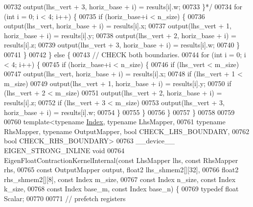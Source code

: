 \begin{DoxyCode}
00732 \textcolor{comment}{      output(lhs\_vert + 3, horiz\_base + i) = results[i].w;}
00733 \textcolor{comment}{    \}*/}
00734     \textcolor{keywordflow}{for} (\textcolor{keywordtype}{int} i = 0; i < 4; i++) \{
00735       \textcolor{keywordflow}{if} (horiz\_base+i < n\_size) \{
00736         output(lhs\_vert, horiz\_base + i) = results[i].x;
00737         output(lhs\_vert + 1, horiz\_base + i) = results[i].y;
00738         output(lhs\_vert + 2, horiz\_base + i) = results[i].z;
00739         output(lhs\_vert + 3, horiz\_base + i) = results[i].w;
00740        \}
00741     \}
00742   \} \textcolor{keywordflow}{else} \{
00743     \textcolor{comment}{// CHECK both boundaries.}
00744     \textcolor{keywordflow}{for} (\textcolor{keywordtype}{int} i = 0; i < 4; i++) \{
00745       \textcolor{keywordflow}{if} (horiz\_base+i < n\_size) \{
00746         \textcolor{keywordflow}{if} (lhs\_vert < m\_size)
00747           output(lhs\_vert, horiz\_base + i) = results[i].x;
00748         \textcolor{keywordflow}{if} (lhs\_vert + 1 < m\_size)
00749           output(lhs\_vert + 1, horiz\_base + i) = results[i].y;
00750         \textcolor{keywordflow}{if} (lhs\_vert + 2 < m\_size)
00751           output(lhs\_vert + 2, horiz\_base + i) = results[i].z;
00752         \textcolor{keywordflow}{if} (lhs\_vert + 3 < m\_size)
00753           output(lhs\_vert + 3, horiz\_base + i) = results[i].w;
00754       \}
00755     \}
00756   \}
00757 \}
00758 
00759 
00760 \textcolor{keyword}{template}<\textcolor{keyword}{typename} \hyperlink{namespace_eigen_a62e77e0933482dafde8fe197d9a2cfde}{Index}, \textcolor{keyword}{typename} LhsMapper,
00761          \textcolor{keyword}{typename} RhsMapper, \textcolor{keyword}{typename} OutputMapper, \textcolor{keywordtype}{bool} CHECK\_LHS\_BOUNDARY,
00762          \textcolor{keywordtype}{bool} CHECK\_RHS\_BOUNDARY>
00763 \_\_device\_\_ EIGEN\_STRONG\_INLINE \textcolor{keywordtype}{void}
00764 EigenFloatContractionKernelInternal(\textcolor{keyword}{const} LhsMapper lhs, \textcolor{keyword}{const} RhsMapper rhs,
00765                        \textcolor{keyword}{const} OutputMapper output, float2 lhs\_shmem2[][32],
00766                        float2 rhs\_shmem2[][8], \textcolor{keyword}{const} Index m\_size,
00767                        \textcolor{keyword}{const} Index n\_size, \textcolor{keyword}{const} Index k\_size,
00768                        \textcolor{keyword}{const} Index base\_m, \textcolor{keyword}{const} Index base\_n) \{
00769   \textcolor{keyword}{typedef} \textcolor{keywordtype}{float} Scalar;
00770 
00771   \textcolor{comment}{// prefetch registers}

\end{DoxyCode}
